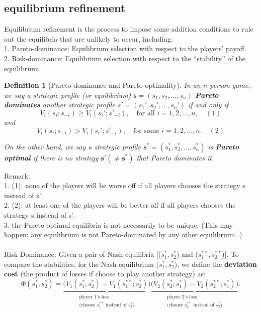 \documentclass[twoside]{article}
\theoremstyle{definitionstyle}
\newtheorem*{definition}{Definition}
\begin{document}
\subsection{equilibrium refinement}
Equilibrium refinement is the process to impose some addition conditions to rule out the equilibria that are unlikely to occur, including: \\
1. Pareto-dominance: Equilibrium selection with respect to the players' payoff. \\
2. Risk-dominance: Equilibrium selection with respect to the “stability” of the equilibrium. 
\begin{definition}[Pareto-dominance and Pareto-optimality]
   In an $n$-person game, we say a strategic profile (or equilibrium) $\mathbf{s} = (s_1, s_2, \dots, s_n)$ \textbf{Pareto dominates} another strategic profile $s' = (s_1', s_2', \dots, s_n')$ if and only if
\[
V_i(s_i; s_{-i}) \geq V_i(s_i'; s'_{-i}), \quad \text{for all } i = 1,2,\dots,n,\quad (1)
\]
and
\[
V_i(s_i; s_{-i}) > V_i(s_i'; s'_{-i}), \quad \text{for some } i = 1,2,\dots,n. \quad (2)
\]

On the other hand, we say a strategic profile $\mathbf{s}^* = (s_1^*, s_2^*, \dots, s_n^*)$ is \textbf{Pareto optimal} if there is no strategy $\mathbf{s}' (\neq \mathbf{s}^*)$ that Pareto dominates it.
\end{definition}
Remark: \\
1. (1): none of the players will be worse off if all 
players chooses the strategy s instead of s'. \\
2. (2): at least one of the players will be better off if all players chooses the strategy s instead of s'.\\
3. the Pareto optimal equilibria is not necessarily to be unique. (This may happen: any equilibrium is not Pareto-dominated by any other equilibrium. )\\
\\
Risk Dominance: Given a pair of Nash equilibria [($s_1^*,s_2^*$) and ($s_1^{**},s_2^{**}$)]. To compare the stabilities, for the Nash equilibrium ($s_1^*,s_2^*$), we define the \textbf{deviation cost} (the product of losses if choose to play another strategy) as: 
\[
\Phi(s_1^*, s_2^*) = 
\underbrace{\bigl(V_1(s_1^*; s_2^*) - V_1(s_1^{**}; s_2^*)\bigr)}_{
\substack{\text{player 1's loss} \\ \text{(choose } s_1^{**} \text{ instead of } s_1^*\text{)}}
}
\underbrace{\bigl(V_2(s_2^*; s_1^*) - V_2(s_2^{**}; s_1^*)\bigr)}_{
\substack{\text{player 2's loss} \\ \text{(choose } s_2^{**} \text{ instead of } s_2^*\text{)}}
}.
\]
\end{document}
